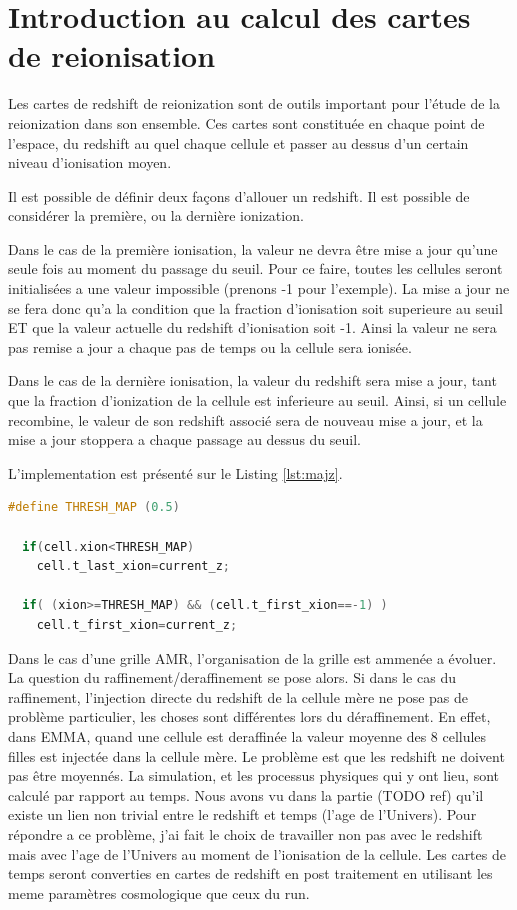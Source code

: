 



\chapter{Introduction au calcul des cartes de reionisation}


Les cartes de redshift de reionization sont de outils important pour l'étude de la reionization dans son ensemble.
Ces cartes sont constituée en chaque point de l'espace, du redshift au quel chaque cellule et passer au dessus d'un certain niveau d'ionisation moyen.

Il est possible de définir deux façons d'allouer un redshift.
Il est possible de considérer la première, ou la dernière ionization.

Dans le cas de la première ionisation, la valeur ne devra être mise a jour qu'une seule fois au moment du passage du seuil.
Pour ce faire, toutes les cellules seront initialisées a une valeur impossible (prenons -1 pour l'exemple).
La mise a jour ne se fera donc qu'a la condition que la fraction d'ionisation soit superieure au seuil ET que la valeur actuelle du redshift d'ionisation soit -1.
Ainsi la valeur ne sera pas remise a jour a chaque pas de temps ou la cellule sera ionisée. 

Dans le cas de la dernière ionisation, la valeur du redshift sera mise a jour, tant que la fraction d'ionization de la cellule est inferieure au seuil.
Ainsi, si un cellule recombine, le valeur de son redshift associé sera de nouveau mise a jour, et la mise a jour stoppera a chaque passage au dessus du seuil.

L'implementation est présenté sur le Listing \ref{lst:majz}.

\begin{lstlisting}[float=bth,language=c,frame=tb,caption={Mise a jour du redshift de reionisation},label=lst:majz]
  #define THRESH_MAP (0.5)

  if(cell.xion<THRESH_MAP)
    cell.t_last_xion=current_z;

  if( (xion>=THRESH_MAP) && (cell.t_first_xion==-1) )
    cell.t_first_xion=current_z;
\end{lstlisting}


Dans le cas d'une grille AMR, l'organisation de la grille est ammenée a évoluer.
La question du raffinement/deraffinement  se pose alors.
Si dans le cas du raffinement, l'injection directe du redshift de la cellule mère ne pose pas de problème particulier, les choses sont différentes lors du déraffinement.
En effet, dans EMMA, quand une cellule est deraffinée la valeur moyenne des 8 cellules filles est injectée dans la cellule mère.
Le problème est que les redshift ne doivent pas être moyennés.
La simulation, et les processus physiques qui y ont lieu, sont calculé par rapport au temps.
Nous avons vu dans la partie (TODO ref) qu'il existe un lien non trivial entre le redshift et temps (l'age de l'Univers).
Pour répondre a ce problème, j'ai fait le choix de travailler non pas avec le redshift mais avec l'age de l'Univers au moment de l'ionisation de la cellule.
Les cartes de temps seront converties en cartes de redshift en post traitement en utilisant les meme paramètres cosmologique que ceux du run.

